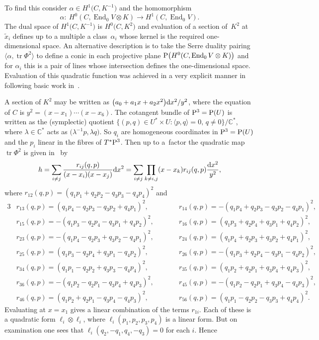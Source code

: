 \documentclass[pdftex]{sigma}
\def\End{\operatorname{End}}
\newcommand{\C}{\mathbb{C}}
\def\tr{\operatorname{tr}}
\newcommand{\PP}{{\rm P}}
\begin{document}
To find this consider $\alpha \in H^1\big(C,K^{-1}\big)$ and the homomorphism
\begin{displaymath}\alpha\colon \ H^0(C, \End_0 V\otimes K)\rightarrow H^1(C,\End_0 V).\end{displaymath}
The dual space of $H^1\big(C,K^{-1}\big)$ is $H^0\big(C,K^2\big)$ and evaluation of a section of~$K^2$ at~$\tilde x_i$ defines up to a multiple a class~$\alpha_i$ whose kernel is the required one-dimensional space. An alternative description is to take the Serre duality pairing $\big\langle \alpha, \tr \Phi^2\big\rangle$ to define a conic in each projective plane $\PP\big(H^0(C,\End_0 V\otimes K)\big)$ and for $\alpha_i$ this is a pair of lines whose intersection defines the one-dimensional space. Evaluation of this quadratic function was achieved in a very explicit manner in~\cite{Gawedzki} following basic work in~\cite{GeemenB/PreviatoE}.

A section of $K^2$ may be written as $\big(a_0+a_1x+a_2x^2\big){\rm d}x^2/y^2$, where the equation of $C$ is $y^2=(x-x_1)\cdots (x-x_6)$. The cotangent bundle of $\PP^3=\PP(U)$ is written as the (symplectic) quotient $\{(p,q)\in U^*\times U\colon \langle p, q \rangle =0,\, q\ne 0\}/\C^*$, where $\lambda\in \C^*$ acts as $\big(\lambda^{-1} p, \lambda q\big)$. So $q_i$ are homogeneous coordinates in $\PP^3=\PP(U)$ and the $p_i$ linear in the fibres of $T^*\PP^3$.
Then up to a~factor the quadratic map $\tr \Phi^2$ is given in~\cite{Gawedzki} by
\begin{displaymath}h=\sum_{i\ne j}\frac{r_{ij}(q,p)}{(x-x_i)(x-x_j)}{\rm d}x^2=\sum_{i\ne j}\prod_{k\ne i,j}(x-x_k){r_{ij}(q,p)}\frac{{\rm d}x^2}{y^2},\end{displaymath}
where
$r_{12}(q,p)= (q_1p_1 + q_2p_2-q_3p_3-q_4p_4)^2$ and
\begin{alignat*}{3}
& r_{13}(q,p)= (q_1p_4-q_2p_3-q_3p_2 + q_4p_1)^2,\qquad &&
r_{14}(q, p) = -(q_1p_4 + q_2p_3-q_3p_2-q_4p_1)^2,&\\
& r_{15}(q, p) = -(q_1p_3-q_2p_4-q_3p_1 + q_4p_2)^2,\qquad &&
r_{16}(q,p)= (q_1p_3 + q_2p_4 + q_3p_1 + q_4p_2)^2,& \\
& r_{23}(q, p) = -(q_1p_4-q_2p_3 + q_3p_2-q_4p_1)^2,\qquad &&
r_{24}(q,p)= (q_1p_4 + q_2p_3 + q_3p_2 + q_4p_1)^2,& \\
& r_{25}(q,p)=(q_1p_3-q_2p_4 + q_3p_1-q_4p_2)^2,\qquad &&
r_{26}(q, p) = -(q_1p_3 + q_2p_4-q_3p_1-q_4p_2)^2, &\\
& r_{34}(q, p) = (q_1p_1-q_2p_2 + q_3p_3-q_4p_4)^2,\qquad &&
r_{35}(q, p) = (q_1p_2 + q_2p_1 + q_3p_4 + q_4p_3)^2, &\\
& r_{36}(q, p) = -(q_1p_2-q_2p_1 -q_3p_4 + q_4p_3)^2, \qquad &&
r_{45}(q, p) = -(q_1p_2-q_2p_1 + q_3p_4-q_4p_3)^2, &\\
& r_{46}(q, p) = (q_1p_2 + q_2p_1-q_3p_4-q_4p_3)^2,\qquad &&
r_{56}(q, p) = (q_1p_1-q_2p_2-q_3p_3 + q_4p_4)^2.&
\end{alignat*}
Evaluating at $x=x_1$ gives a linear combination of the terms $r_{1i}$. Each of these is a quadratic form $\ell_i\otimes \ell_i$, where $\ell_i(p_1,p_2,p_3,p_4)$ is a linear form. But on examination one sees that $\ell_i(q_2, {-}q_1, q_4,\allowbreak {-}q_3) =0$ for each $i$.
 Hence
\end{document}
